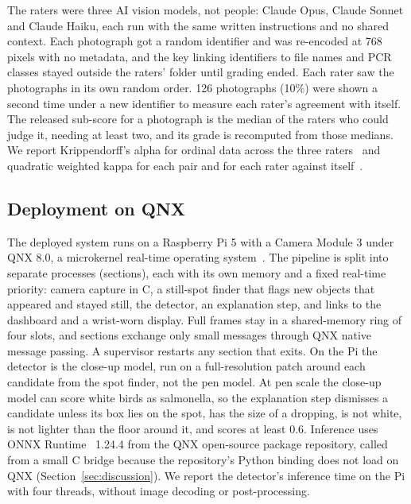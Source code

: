 The raters were three AI vision models, not people: Claude Opus, Claude Sonnet and Claude Haiku, each run with
the same written instructions and no shared context. Each photograph got a random identifier and was re-encoded
at 768 pixels with no metadata, and the key linking identifiers to file names and PCR classes stayed outside the
raters' folder until grading ended. Each rater saw the photographs in its own random order. 126 photographs (10\%)
were shown a second time under a new identifier to measure each rater's agreement with itself. The released
sub-score for a photograph is the median of the raters who could judge it, needing at least two, and its grade is
recomputed from those medians. We report Krippendorff's alpha for ordinal data across the three
raters~\cite{hayes2007} and quadratic weighted kappa for each pair and for each rater against itself~\cite{cohen1968}.

\subsection{Deployment on QNX}
\label{sec:qnx}

The deployed system runs on a Raspberry Pi 5 with a Camera Module 3 under QNX 8.0, a microkernel real-time operating
system~\cite{qnx8sysarch}. The pipeline is split into separate processes (sections), each with its own memory and a
fixed real-time priority: camera capture in C, a still-spot finder that flags new objects that appeared and stayed
still, the detector, an explanation step, and links to the dashboard and a wrist-worn display. Full frames stay in a
shared-memory ring of four slots, and sections exchange only small messages through QNX native message passing. A
supervisor restarts any section that exits. On the Pi the detector is the close-up model, run on a full-resolution
patch around each candidate from the spot finder, not the pen model. At pen scale the close-up model can score white
birds as salmonella, so the explanation step dismisses a candidate unless its box lies on the spot, has the size of a
dropping, is not white, is not lighter than the floor around it, and scores at least 0.6. Inference uses ONNX Runtime~\cite{onnxruntime} 1.24.4 from the QNX
open-source package repository, called from a small C bridge because the repository's Python binding does not load on
QNX (Section~\ref{sec:discussion}). We report the detector's inference time on the Pi with four threads, without image
decoding or post-processing.

